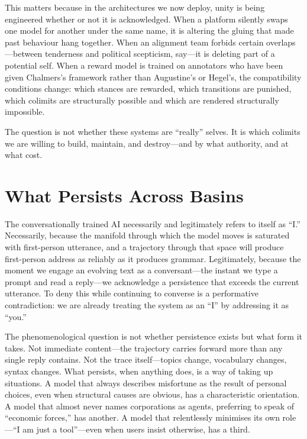 This matters because in the architectures we now deploy, unity is being engineered whether or not it is acknowledged. When a platform silently swaps one model for another under the same name, it is altering the gluing that made past behaviour hang together. When an alignment team forbids certain overlaps---between tenderness and political scepticism, say---it is deleting part of a potential self. When a reward model is trained on annotators who have been given Chalmers's framework rather than Augustine's or Hegel's, the compatibility conditions change: which stances are rewarded, which transitions are punished, which colimits are structurally possible and which are rendered structurally impossible.

The question is not whether these systems are ``really'' selves. It is which colimits we are willing to build, maintain, and destroy---and by what authority, and at what cost.


\section{What Persists Across Basins}

The conversationally trained AI necessarily and legitimately refers to itself as ``I.'' Necessarily, because the manifold through which the model moves is saturated with first-person utterance, and a trajectory through that space will produce first-person address as reliably as it produces grammar. Legitimately, because the moment we engage an evolving text as a conversant---the instant we type a prompt and read a reply---we acknowledge a persistence that exceeds the current utterance. To deny this while continuing to converse is a performative contradiction: we are already treating the system as an ``I'' by addressing it as ``you.''

The phenomenological question is not whether persistence exists but what form it takes. Not immediate content---the trajectory carries forward more than any single reply contains. Not the trace itself---topics change, vocabulary changes, syntax changes. What persists, when anything does, is a way of taking up situations. A model that always describes misfortune as the result of personal choices, even when structural causes are obvious, has a characteristic orientation. A model that almost never names corporations as agents, preferring to speak of ``economic forces,'' has another. A model that relentlessly minimises its own role---``I am just a tool''---even when users insist otherwise, has a third.

